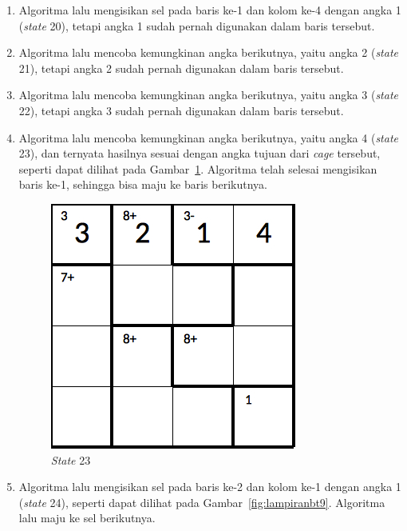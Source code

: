 \begin{enumerate}
\item Algoritma lalu mengisikan sel pada baris ke-1 dan kolom ke-4 dengan angka 1 (\textit{state} 20), tetapi angka 1 sudah pernah digunakan dalam baris tersebut.
\item Algoritma lalu mencoba kemungkinan angka berikutnya, yaitu angka 2 (\textit{state} 21), tetapi angka 2 sudah pernah digunakan dalam baris tersebut.
\item Algoritma lalu mencoba kemungkinan angka berikutnya, yaitu angka 3 (\textit{state} 22), tetapi angka 3 sudah pernah digunakan dalam baris tersebut.
\item Algoritma lalu mencoba kemungkinan angka berikutnya, yaitu angka 4 (\textit{state} 23), dan ternyata hasilnya sesuai dengan angka tujuan dari \textit{cage} tersebut, seperti dapat dilihat pada Gambar~\ref{fig:lampiranbt8}. Algoritma telah selesai mengisikan baris ke-1, sehingga bisa maju ke baris berikutnya.

\begin{figure}
\centering
\captionsetup{justification=centering}
\includegraphics[scale=0.333]{Gambar/backtracking/State23}
\caption[\textit{State} 23]{\textit{State} 23}
\label{fig:lampiranbt8}
\end{figure}

\item Algoritma lalu mengisikan sel pada baris ke-2 dan kolom ke-1 dengan angka 1 (\textit{state} 24), seperti dapat dilihat pada Gambar~\ref{fig:lampiranbt9}. Algoritma lalu maju ke sel berikutnya.


\end{enumerate}
